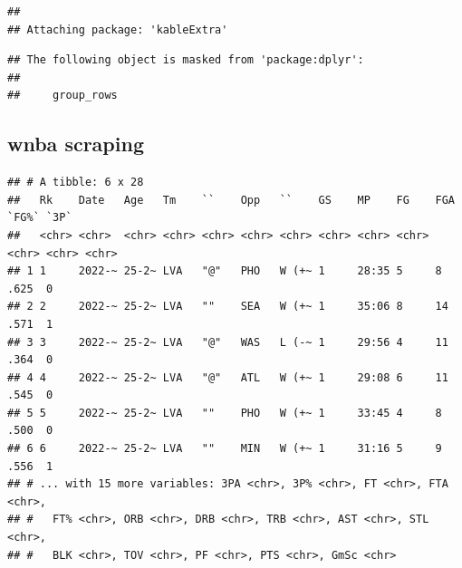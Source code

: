 \documentclass[]{article}
\newenvironment{Shaded}{\begin{snugshade}}{\end{snugshade}}
\newcommand{\DataTypeTok}[1]{\textcolor[rgb]{0.13,0.29,0.53}{#1}}
\newcommand{\DecValTok}[1]{\textcolor[rgb]{0.00,0.00,0.81}{#1}}
\newcommand{\KeywordTok}[1]{\textcolor[rgb]{0.13,0.29,0.53}{\textbf{#1}}}
\newcommand{\NormalTok}[1]{#1}
\newcommand{\OperatorTok}[1]{\textcolor[rgb]{0.81,0.36,0.00}{\textbf{#1}}}
\newcommand{\StringTok}[1]{\textcolor[rgb]{0.31,0.60,0.02}{#1}}
\begin{document}
\begin{verbatim}
## 
## Attaching package: 'kableExtra'
\end{verbatim}

\begin{verbatim}
## The following object is masked from 'package:dplyr':
## 
##     group_rows
\end{verbatim}

\hypertarget{wnba-scraping}{%
\subsection{wnba scraping}\label{wnba-scraping}}

\begin{Shaded}
\end{Shaded}

\begin{verbatim}
## # A tibble: 6 x 28
##   Rk    Date   Age   Tm    ``    Opp   ``    GS    MP    FG    FGA   `FG%` `3P` 
##   <chr> <chr>  <chr> <chr> <chr> <chr> <chr> <chr> <chr> <chr> <chr> <chr> <chr>
## 1 1     2022-~ 25-2~ LVA   "@"   PHO   W (+~ 1     28:35 5     8     .625  0    
## 2 2     2022-~ 25-2~ LVA   ""    SEA   W (+~ 1     35:06 8     14    .571  1    
## 3 3     2022-~ 25-2~ LVA   "@"   WAS   L (-~ 1     29:56 4     11    .364  0    
## 4 4     2022-~ 25-2~ LVA   "@"   ATL   W (+~ 1     29:08 6     11    .545  0    
## 5 5     2022-~ 25-2~ LVA   ""    PHO   W (+~ 1     33:45 4     8     .500  0    
## 6 6     2022-~ 25-2~ LVA   ""    MIN   W (+~ 1     31:16 5     9     .556  1    
## # ... with 15 more variables: 3PA <chr>, 3P% <chr>, FT <chr>, FTA <chr>,
## #   FT% <chr>, ORB <chr>, DRB <chr>, TRB <chr>, AST <chr>, STL <chr>,
## #   BLK <chr>, TOV <chr>, PF <chr>, PTS <chr>, GmSc <chr>
\end{verbatim}
\end{document}
